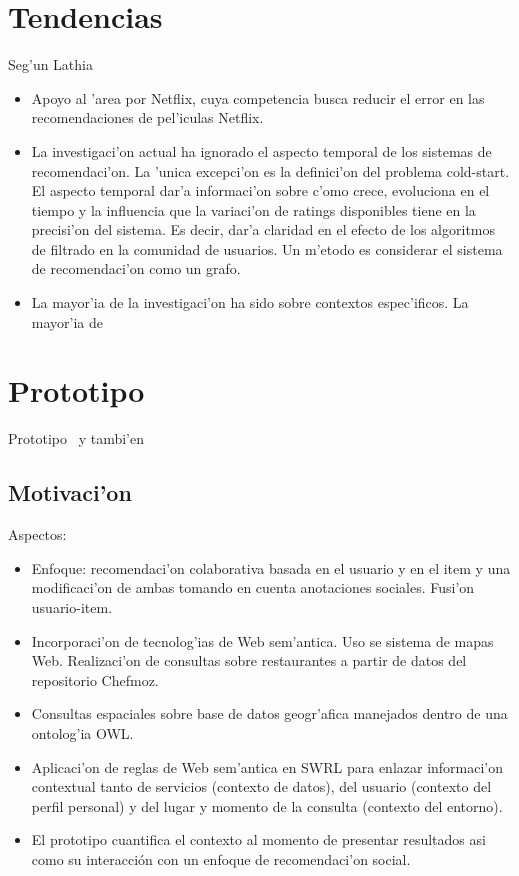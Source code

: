 \documentclass[11pt]{article}
\begin{document}
\section{Tendencias}
Seg'un Lathia\\
\begin{itemize}
\item Apoyo al 'area por Netflix, cuya competencia busca reducir el error en las recomendaciones de pel'iculas Netflix.
\item La investigaci'on actual ha ignorado el aspecto temporal de los sistemas de recomendaci'on. La 'unica excepci'on es la definici'on del problema cold-start. El aspecto temporal dar'a informaci'on sobre c'omo crece, evoluciona en el tiempo y la influencia que la variaci'on de ratings disponibles tiene en la precisi'on del sistema. Es decir, dar'a claridad en el efecto de los algoritmos de filtrado en la comunidad de usuarios. Un m'etodo es considerar el sistema de recomendaci'on como un grafo.
\item La mayor'ia de la investigaci'on ha sido sobre contextos espec'ificos. La mayor'ia de 
\end{itemize}


\section{Prototipo}
Prototipo~\cite{rep1:isra} y tambi'en~\cite{rep2:isra}\\

\subsection{Motivaci'on}
Aspectos:
\begin{itemize}
\item Enfoque: recomendaci'on colaborativa basada en el usuario y en el item y una modificaci'on de ambas tomando en cuenta anotaciones sociales. Fusi'on usuario-item.
\item Incorporaci'on de tecnolog'ias de Web sem'antica. Uso se sistema de mapas Web. Realizaci'on de consultas sobre restaurantes a partir de datos del repositorio Chefmoz. 
\item Consultas espaciales sobre base de datos geogr'afica manejados dentro de una ontolog'ia OWL. 
\item Aplicaci'on de reglas de Web sem'antica en SWRL para enlazar informaci'on contextual tanto de servicios (contexto de datos), del usuario (contexto del perfil personal) y del lugar y momento de la consulta (contexto del entorno).
\item El prototipo cuantifica el contexto al momento de presentar resultados asi como su interacción con un enfoque de recomendaci'on social.
\end{itemize}
\end{document}
